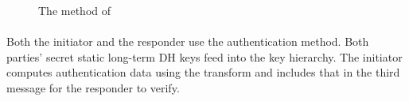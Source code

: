 \begin{figure}[h]
{}
\caption{The \mStatSig{} method of \mEdhoc}
\label{fig:edhocstatsig}
\end{figure}
%

\paragraph{\mStatStat}
Both the initiator and the responder use the \mStat{}
authentication method.
%
Both parties' secret static long-term DH keys feed into the key hierarchy.
%
The initiator computes authentication data using the \mAead{} transform
and includes that in the third message for the responder to verify.
%

